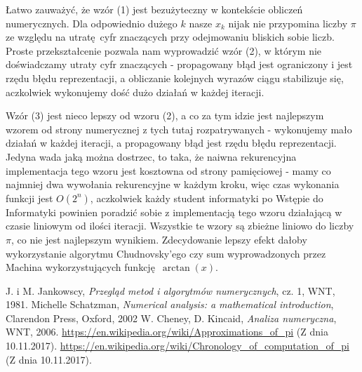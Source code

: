 \documentclass[10pt,wide]{mwart}
\theoremstyle{definition}
\begin{document}
\par Łatwo zauważyć, że wzór (1) jest bezużyteczny w kontekście obliczeń numerycznych. Dla odpowiednio dużego \(k\) nasze \( x_k \) nijak nie przypomina liczby \(\pi\) ze względu na utratę cyfr znaczących przy odejmowaniu bliskich sobie liczb.
Proste przekształcenie pozwala nam wyprowadzić wzór (2), w którym nie doświadczamy utraty cyfr znaczących - propagowany błąd jest ograniczony i jest rzędu błędu reprezentacji, a obliczanie kolejnych wyrazów ciągu stabilizuje się, aczkolwiek wykonujemy dość dużo działań w każdej iteracji.
\par Wzór (3) jest nieco lepszy od wzoru (2), a co za tym idzie jest najlepszym wzorem od strony numerycznej z tych tutaj rozpatrywanych - wykonujemy mało działań w każdej iteracji, a propagowany błąd jest rzędu błędu reprezentacji.
Jedyna wada jaką można dostrzec, to taka, że naiwna rekurencyjna implementacja tego wzoru jest kosztowna od strony pamięciowej - mamy co najmniej dwa wywołania rekurencyjne w każdym kroku, więc czas wykonania funkcji jest \(O(2^n)\),
aczkolwiek każdy student informatyki po Wstępie do Informatyki powinien poradzić sobie z implementacją tego wzoru działającą w czasie liniowym od ilości iteracji.
Wszystkie te wzory są zbieżne liniowo do liczby \(\pi\), co nie jest najlepszym wynikiem.
Zdecydowanie lepszy efekt dałoby wykorzystanie algorytmu Chudnovsky'ego czy sum wyprowadzonych przez Machina wykorzystujących funkcję \(\arctan(x)\).

\begin{thebibliography}{9}
\itemsep10pt
 J. i M. Jankowscy, \emph{Przegląd metod i algorytmów numerycznych}, cz. 1, WNT, 1981.
 Michelle Schatzman, \emph{Numerical analysis: a mathematical introduction}, Clarendon Press, Oxford, 2002
 W. Cheney, D. Kincaid, \emph{Analiza numeryczna}, WNT, 2006.
 \url{https://en.wikipedia.org/wiki/Approximations_of_pi} (Z dnia 10.11.2017).
 \url{https://en.wikipedia.org/wiki/Chronology_of_computation_of_pi} (Z dnia 10.11.2017).
\end{thebibliography}
\end{document}
